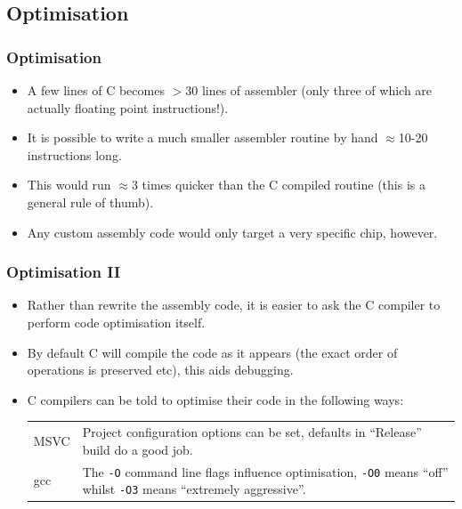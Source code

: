 \documentclass[smaller,handout,table]{beamer}
\begin{document}
\subsection{Optimisation}
\begin{frame}
\frametitle{Optimisation}
\begin{itemize}
\item A few lines of C becomes $>30$ lines of assembler (only three of which are actually floating point instructions!).
\item It is possible to write a much smaller assembler routine by hand $\approx$10-20 instructions long.
\item This would run $\approx$3 times quicker than the C compiled routine (this is a general rule of thumb).
\item Any custom assembly code would only target a very specific chip, however.
\end{itemize}
\end{frame}

\begin{frame}
\frametitle{Optimisation II}
\begin{itemize}
\item Rather than rewrite the assembly code, it is easier to ask the C compiler to perform code optimisation itself.
\item By default C will compile the code as it appears (the exact order of operations is preserved etc), this aids debugging.
\item C compilers can be told to optimise their code in the following ways:
\begin{center}
\begin{tabular}{l p{220pt}}
MSVC&Project configuration options can be set, defaults in ``Release'' build do a good job.\\
gcc&The {\tt -O} command line flags influence optimisation, {\tt -O0} means ``off'' whilst {\tt -O3} means ``extremely aggressive''.
\end{tabular}
\end{center}
\end{itemize}
\end{frame}
\end{document}
